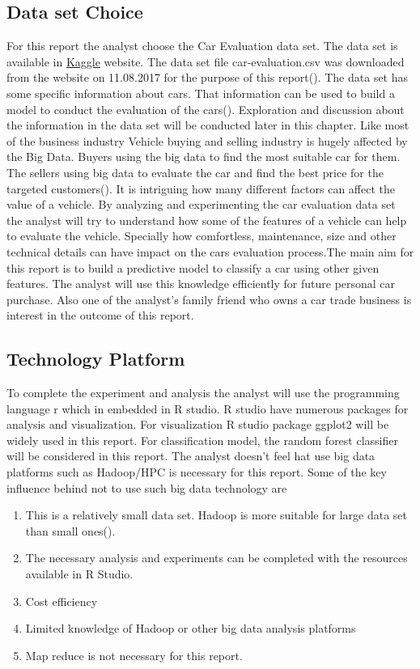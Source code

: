 \documentclass{article}
\begin{document}
\subsection{Data set Choice}
For this report the analyst choose the Car Evaluation data set. The data set is available in \href {https://www.kaggle.com/elikplim/car-evaluation-data-set}{Kaggle}  website. The data set file car-evaluation.csv was downloaded from the website on 11.08.2017 for the purpose of this report(\textcite{Kaggle}). The data set has some specific information about cars. That information can be used to build a model to conduct the evaluation of the cars(\textcite{UCI}). Exploration and discussion about the information in the data set will be conducted later in this chapter.
\break
\break
Like most of the business industry Vehicle buying and selling industry is hugely affected by the Big Data. Buyers using the big data to find the most suitable car for them. The sellers using big data to evaluate the car and find the best price for the targeted customers(\textcite{Lloyd}). It is intriguing how many different factors can affect the value of a vehicle.
\break
\break
By analyzing and experimenting the car evaluation data set the analyst will try to understand how some of the features of a vehicle can help to evaluate the vehicle. Specially how comfortless, maintenance, size and other technical details can have  impact on the cars evaluation process.The main aim for this report is to build a predictive model to classify a car using other given features. The analyst will use this knowledge efficiently for future personal car purchase. Also one of the analyst's family friend who owns a car trade business is interest in the outcome of this report.


\subsection{Technology Platform}
To complete the experiment and analysis the analyst will use the programming language r which in embedded in R studio. R studio have numerous packages for analysis and visualization. For visualization R studio package ggplot2 will be widely used in this report. For classification model, the random forest classifier will be considered in this report.
The analyst doesn't feel hat use big data platforms such as Hadoop/HPC is necessary for this report. Some of the key influence behind not to use such big data technology are
\begin{enumerate}
  \item This is a relatively small data set. Hadoop is more suitable for large data set than small ones(\textcite {Crayon}).
  \item The necessary analysis and experiments can be completed with the resources available in R Studio.
  \item Cost efficiency
  \item Limited knowledge of Hadoop or other big data analysis platforms
  \item Map reduce is not necessary for this report.
\end{enumerate}
\end{document}
